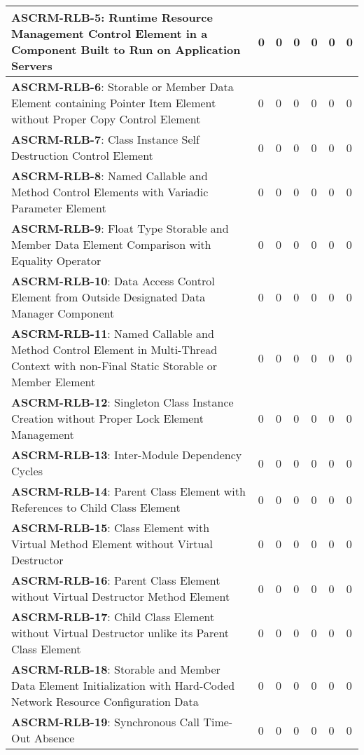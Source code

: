 \documentclass[openany,10pt,a4paper]{article}
\begin{document}
\begin{longtable}{p{3.2in}|p{0.28in}|p{0.28in}|p{0.28in}|p{0.28in}|p{0.28in}|p{0.35in}}
\textbf{ASCRM-RLB-5}: Runtime Resource Management Control Element in a Component Built to Run on Application Servers & 0 & 0 & 0 & 0 & 0 & 0 \\ \hline
\textbf{ASCRM-RLB-6}: Storable or Member Data Element containing Pointer Item Element without Proper Copy Control Element & 0 & 0 & 0 & 0 & 0 & 0 \\ \hline
\textbf{ASCRM-RLB-7}: Class Instance Self Destruction Control Element & 0 & 0 & 0 & 0 & 0 & 0 \\ \hline
\textbf{ASCRM-RLB-8}: Named Callable and Method Control Elements with Variadic Parameter Element & 0 & 0 & 0 & 0 & 0 & 0 \\ \hline
\textbf{ASCRM-RLB-9}: Float Type Storable and Member Data Element Comparison with Equality Operator & 0 & 0 & 0 & 0 & 0 & 0 \\ \hline
\textbf{ASCRM-RLB-10}: Data Access Control Element from Outside Designated Data Manager Component & 0 & 0 & 0 & 0 & 0 & 0 \\ \hline
\textbf{ASCRM-RLB-11}: Named Callable and Method Control Element in Multi-Thread Context with non-Final Static Storable or Member Element & 0 & 0 & 0 & 0 & 0 & 0 \\ \hline
\textbf{ASCRM-RLB-12}: Singleton Class Instance Creation without Proper Lock Element Management & 0 & 0 & 0 & 0 & 0 & 0 \\ \hline
\textbf{ASCRM-RLB-13}: Inter-Module Dependency Cycles & 0 & 0 & 0 & 0 & 0 & 0 \\ \hline
\textbf{ASCRM-RLB-14}: Parent Class Element with References to Child Class Element & 0 & 0 & 0 & 0 & 0 & 0 \\ \hline
\textbf{ASCRM-RLB-15}: Class Element with Virtual Method Element without Virtual Destructor & 0 & 0 & 0 & 0 & 0 & 0 \\ \hline
\textbf{ASCRM-RLB-16}: Parent Class Element without Virtual Destructor Method Element & 0 & 0 & 0 & 0 & 0 & 0 \\ \hline
\textbf{ASCRM-RLB-17}: Child Class Element without Virtual Destructor unlike its Parent Class Element & 0 & 0 & 0 & 0 & 0 & 0 \\ \hline
\textbf{ASCRM-RLB-18}: Storable and Member Data Element Initialization with Hard-Coded Network Resource Configuration Data & 0 & 0 & 0 & 0 & 0 & 0 \\ \hline
\textbf{ASCRM-RLB-19}: Synchronous Call Time-Out Absence & 0 & 0 & 0 & 0 & 0 & 0 \\ \hline
	\end{longtable} 
\end{document}
